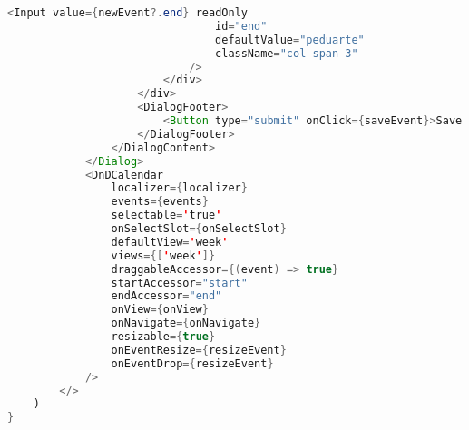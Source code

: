 \begin{lstlisting}[language=Java, caption={Calendar Page}, label={lst:java}]
                            <Input value={newEvent?.end} readOnly
                                id="end"
                                defaultValue="peduarte"
                                className="col-span-3"
                            />
                        </div>
                    </div>
                    <DialogFooter>
                        <Button type="submit" onClick={saveEvent}>Save changes</Button>
                    </DialogFooter>
                </DialogContent>
            </Dialog>
            <DnDCalendar
                localizer={localizer}
                events={events}
                selectable='true'
                onSelectSlot={onSelectSlot}
                defaultView='week'
                views={['week']}
                draggableAccessor={(event) => true}
                startAccessor="start"
                endAccessor="end"
                onView={onView}
                onNavigate={onNavigate}
                resizable={true}
                onEventResize={resizeEvent}
                onEventDrop={resizeEvent}
            />
        </>
    )
}
\end{lstlisting}
